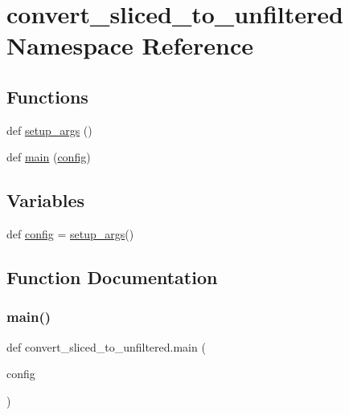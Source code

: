 \hypertarget{namespaceconvert__sliced__to__unfiltered}{}\section{convert\+\_\+sliced\+\_\+to\+\_\+unfiltered Namespace Reference}
\label{namespaceconvert__sliced__to__unfiltered}
\subsection*{Functions}
\begin{DoxyCompactItemize}
\item 
def \hyperlink{namespaceconvert__sliced__to__unfiltered_a21ac677a0cb0c5ba6129567460c1ee35}{setup\+\_\+args} ()
\item 
def \hyperlink{namespaceconvert__sliced__to__unfiltered_a90657fd736afc2f0af90b8cbdb3ee2aa}{main} (\hyperlink{namespaceconvert__sliced__to__unfiltered_a53af57b08cb362399bd3263e7a94c646}{config})
\end{DoxyCompactItemize}
\subsection*{Variables}
\begin{DoxyCompactItemize}
\item 
def \hyperlink{namespaceconvert__sliced__to__unfiltered_a53af57b08cb362399bd3263e7a94c646}{config} = \hyperlink{namespaceconvert__sliced__to__unfiltered_a21ac677a0cb0c5ba6129567460c1ee35}{setup\+\_\+args}()
\end{DoxyCompactItemize}


\subsection{Function Documentation}
\mbox{\label{namespaceconvert__sliced__to__unfiltered_a90657fd736afc2f0af90b8cbdb3ee2aa}} 
\subsubsection{\texorpdfstring{main()}{main()}}
{\footnotesize\ttfamily def convert\+\_\+sliced\+\_\+to\+\_\+unfiltered.\+main (\begin{DoxyParamCaption}\item[{}]{config }\end{DoxyParamCaption})}

